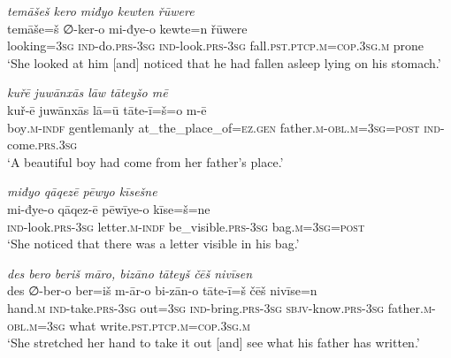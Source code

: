 \ea \label{KŠ.67}
\textit{temāšeš kero miđyo kewten řūwere} \\ 
\gll temāše=š ∅-ker-o mi-đye-o kewte=n řūwere \\ 
 looking\textsc{=3sg} \textsc{ind-}do\textsc{.prs}\textsc{-3sg} \textsc{ind-}look\textsc{.prs}\textsc{-3sg} fall\textsc{.pst}\textsc{.ptcp}\textsc{.m}\textsc{=cop}\textsc{.3sg}\textsc{.m} prone \\ 
\glt `She looked at him [and] noticed that he had fallen asleep lying on his stomach.'
\z 
 
\ea \label{KŠ.68}
\textit{kuřē juwānxās lāw tāteyšo mē} \\ 
\gll kuř-ē juwānxās lā=ū tāte-ī=š=o m-ē \\ 
 boy\textsc{.m}\textsc{-indf} gentlemanly at\_the\_place\_of\textsc{\textsc{=ez.gen}} father\textsc{.m}\textsc{-obl}\textsc{.m}\textsc{=3sg}\textsc{=\textsc{post}} \textsc{ind-}come\textsc{.prs}\textsc{.3sg} \\ 
\glt `A beautiful boy had come from her father’s place.'
\z 
 
\ea \label{KŠ.70}
\textit{miđyo qāqezē pēwyo kīsešne} \\ 
\gll mi-đye-o qāqez-ē pēwīye-o kīse=š=ne \\ 
 \textsc{ind-}look\textsc{.prs}\textsc{-3sg} letter\textsc{.m}\textsc{-indf} be\_visible\textsc{.prs}\textsc{-3sg} bag\textsc{.m}\textsc{=3sg}\textsc{=\textsc{post}} \\ 
\glt `She noticed that there was a letter visible in his bag.'
\z 
 
\ea \label{KŠ.71}
\textit{des bero beriš māro, bizāno tāteyš čēš nivīsen} \\ 
\gll des ∅-ber-o ber=iš m-ār-o bi-zān-o tāte-ī=š čēš nivīse=n \\ 
 hand\textsc{.m} \textsc{ind-}take\textsc{.prs}\textsc{-3sg} out\textsc{=3sg} \textsc{ind-}bring\textsc{.prs}\textsc{-3sg} \textsc{sbjv-}know\textsc{.prs}\textsc{-3sg} father\textsc{.m}\textsc{-obl}\textsc{.m}\textsc{=3sg} what write\textsc{.pst}\textsc{.ptcp}\textsc{.m}\textsc{=cop}\textsc{.3sg}\textsc{.m} \\ 
\glt `She stretched her hand to take it out [and] see what his father has written.'
\z 
 
